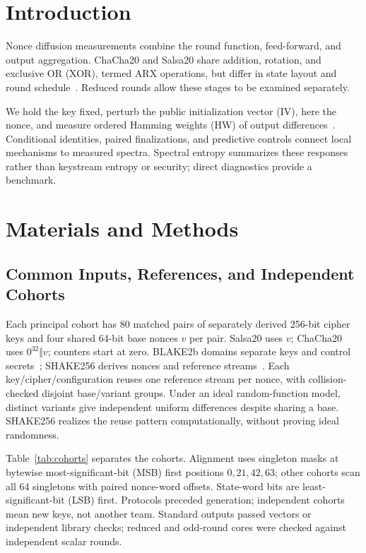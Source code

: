 \documentclass[electronics,article,submit,pdftex,oneauthor]{Definitions/mdpi}
\begin{document}
\section{Introduction}

Nonce diffusion measurements combine the round function, feed-forward, and output aggregation. ChaCha20 and Salsa20 share addition, rotation, and exclusive OR (XOR), termed ARX operations, but differ in state layout and round schedule~\citep{nir2018,bernstein2008salsa}. Reduced rounds allow these stages to be examined separately.

We hold the key fixed, perturb the public initialization vector (IV), here the nonce, and measure ordered Hamming weights (HW) of output differences~\citep{englund2007,fischer2008}. Conditional identities, paired finalizations, and predictive controls connect local mechanisms to measured spectra. Spectral entropy summarizes these responses rather than keystream entropy or security; direct diagnostics provide a benchmark.



\section{Materials and Methods}
\subsection{Common Inputs, References, and Independent Cohorts}

Each principal cohort has 80 matched pairs of separately derived 256-bit cipher keys and four shared 64-bit base nonces $v$ per pair. Salsa20 uses $v$; ChaCha20 uses $0^{32}\Vert v$; counters start at zero. BLAKE2b domains separate keys and control secrets~\citep{saarinen2015}; SHAKE256 derives nonces and reference streams~\citep{nist2015sha3}. Each key/cipher/configuration reuses one reference stream per nonce, with collision-checked disjoint base/variant groups. Under an ideal random-function model, distinct variants give independent uniform differences despite sharing a base. SHAKE256 realizes the reuse pattern computationally, without proving ideal randomness.

Table~\ref{tab:cohorts} separates the cohorts. Alignment uses singleton masks at bytewise most-significant-bit (MSB) first positions $0,21,42,63$; other cohorts scan all 64 singletons with paired nonce-word offsets. State-word bits are least-significant-bit (LSB) first. Protocols preceded generation; independent cohorts mean new keys, not another team. Standard outputs passed vectors or independent library checks; reduced and odd-round cores were checked against independent scalar rounds.
\end{document}
